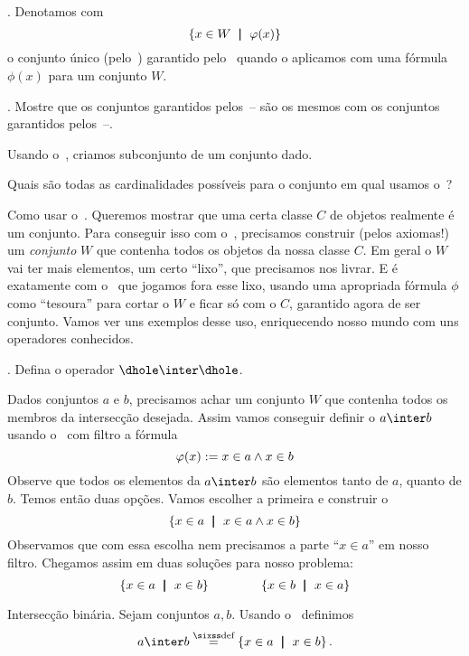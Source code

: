 {%
.
Denotamos com
$$
\left\{x \in W \ \;\mathord{\pmb{\mid}}\;\ \varphi(x)\right\}
$$
o conjunto único (pelo~) garantido pelo~ quando o aplicamos com uma fórmula $\phi(x)$ para um conjunto $W$.

\exercise.
\label{separation_yields_no_new_sets_yet}%
Mostre que os conjuntos garantidos pelos~--
são os mesmos com os conjuntos garantidos pelos~--.

\hint
Usando o~, criamos subconjunto de um conjunto dado.

\hint
Quais são todas as cardinalidades possíveis para o conjunto em qual
usamos o~?

\endexercise

\note Como usar o~.
Queremos mostrar que uma certa classe $C$ de objetos realmente é um conjunto.
Para conseguir isso com o~,
precisamos construir (pelos axiomas!) um \emph{conjunto}
$W$ que contenha todos os objetos da nossa classe $C$.
Em geral o $W$ vai ter mais elementos, um certo ``lixo'', que precisamos nos livrar.
E é exatamente com o~ que jogamos fora esse lixo,
usando uma apropriada fórmula $\phi$ como ``tesoura'' para cortar o $W$ e ficar só com o $C$,
garantido agora de ser conjunto.
Vamos ver uns exemplos desse uso,
enriquecendo nosso mundo com uns operadores conhecidos.

\example.
Defina o operador $\dhole\inter\dhole$.

\solution
Dados conjuntos $a$ e $b$,
precisamos achar um conjunto $W$ que contenha todos os membros
da intersecção desejada.  Assim vamos conseguir definir o $a \inter b$
usando o~ com filtro a fórmula
$$
\varphi(x)\mathrel{:=} {x \in a \land x \in b}
$$
Observe que todos os elementos da $a \inter b$ são elementos tanto de $a$,
quanto de $b$.
Temos então duas opções.  Vamos escolher a primeira e construir o
$$
\left\{x \in a \ \;\mathord{\pmb{\mid}}\;\ x \in a \land x \in b\right\}
$$
Observamos que com essa escolha nem precisamos a parte ``$x \in a$'' em nosso filtro.
Chegamos assim em duas soluções para nosso problema:
$$
\left\{x \in a \ \;\mathord{\pmb{\mid}}\;\ x \in b\right\}
\hskip 4em\relax
\left\{x \in b \ \;\mathord{\pmb{\mid}}\;\ x \in a\right\}
$$

\endexample

 Intersecção binária.
\label{inters_constructed}%
Sejam conjuntos $a,b$.
Usando o~ definimos
$$
a\inter b \defeq \setst {x\in a} {x\in b}.
$$

}
